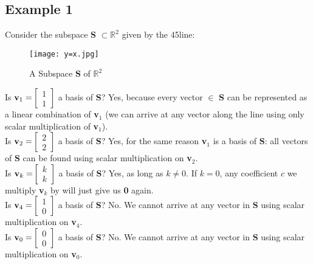 \documentclass{article}
\theoremstyle{definition}
\begin{document}
\subsection{Example 1}
Consider the subspace \textbf{S} $\subset \mathbb{R}^{2}$ given by the 45\degree line: \\
\begin{figure}[H]
\texttt{[image: y=x.jpg]}
\caption{ A Subspace \textbf{S} of $\mathbb{R}^2$}
\end{figure}
Is $\text{\textbf{v}}_{1} =  $$\begin{bmatrix}1\\1\end{bmatrix}$$ $ a basis of \textbf{S}? Yes, because every vector $\in$ \textbf{S} can be represented as a linear combination of \textbf{v}$_{1}$ (we can arrive at any vector along the line using only scalar multiplication of \textbf{v}$_{1}$).\\
\linebreak
Is $\text{\textbf{v}}_{2} =  $$\begin{bmatrix}2\\2\end{bmatrix}$$ $ a basis of \textbf{S}? Yes, for the same reason \textbf{v}$_{1}$ is a basis of \textbf{S}: all vectors of \textbf{S} can be found using scalar multiplication on  \textbf{v}$_{2}$.\\
\linebreak
Is $\text{\textbf{v}}_{k} =  $$\begin{bmatrix}k\\k\end{bmatrix}$$ $ a basis of \textbf{S}? Yes, as long as $k\ne0$. If $k=0$, any coefficient $c$ we multiply  \textbf{v}$_{k}$ by will just give us \textbf{0} again.\\
\linebreak
Is $\text{\textbf{v}}_{4} =  $$\begin{bmatrix}1\\0\end{bmatrix}$$ $ a basis of \textbf{S}? No. We cannot arrive at any vector in \textbf{S} using scalar multiplication on   \textbf{v}$_{4}$.\\
\linebreak
Is $\text{\textbf{v}}_{0} =  $$\begin{bmatrix}0\\0\end{bmatrix}$$ $ a basis of \textbf{S}?  No. We cannot arrive at any vector in \textbf{S} using scalar multiplication on   \textbf{v}$_{0}$.
\end{document}
